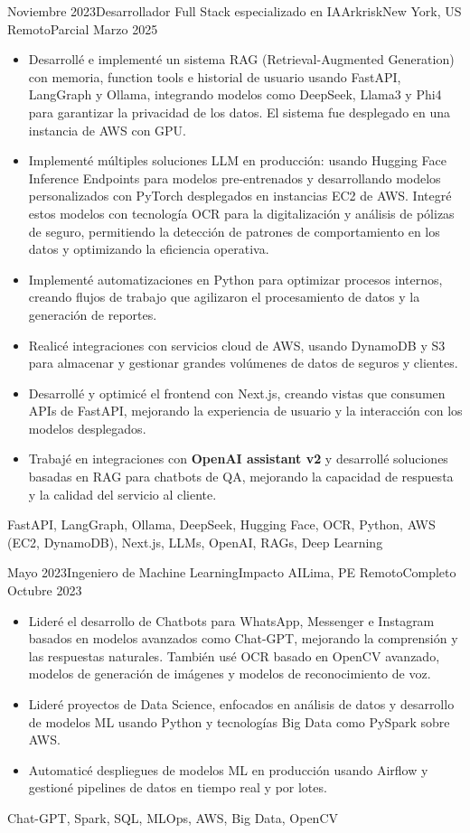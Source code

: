 \begin{experiences}
\emptySeparator
\experience
  {Noviembre 2023}{Desarrollador Full Stack especializado en IA}{Arkrisk}{New York, US}
  {Remoto}{Parcial}
  {Marzo 2025} {
    \begin{itemize}
      \item Desarrollé e implementé un sistema RAG (Retrieval-Augmented Generation) con memoria, function tools e historial de usuario usando FastAPI, LangGraph y Ollama, integrando modelos como DeepSeek, Llama3 y Phi4 para garantizar la privacidad de los datos. El sistema fue desplegado en una instancia de AWS con GPU.
      \item Implementé múltiples soluciones LLM en producción: usando Hugging Face Inference Endpoints para modelos pre-entrenados y desarrollando modelos personalizados con PyTorch desplegados en instancias EC2 de AWS. Integré estos modelos con tecnología OCR para la digitalización y análisis de pólizas de seguro, permitiendo la detección de patrones de comportamiento en los datos y optimizando la eficiencia operativa.
      \item Implementé automatizaciones en Python para optimizar procesos internos, creando flujos de trabajo que agilizaron el procesamiento de datos y la generación de reportes.
      \item Realicé integraciones con servicios cloud de AWS, usando DynamoDB y S3 para almacenar y gestionar grandes volúmenes de datos de seguros y clientes.
      \item Desarrollé y optimicé el frontend con Next.js, creando vistas que consumen APIs de FastAPI, mejorando la experiencia de usuario y la interacción con los modelos desplegados.
      \item Trabajé en integraciones con \textbf{OpenAI assistant v2} y desarrollé soluciones basadas en RAG para chatbots de QA, mejorando la capacidad de respuesta y la calidad del servicio al cliente.
    \end{itemize}
  }
  {FastAPI, LangGraph, Ollama, DeepSeek, Hugging Face, OCR, Python, {AWS (EC2, DynamoDB)}, Next.js, LLMs, OpenAI, RAGs, Deep Learning}

\emptySeparator
\experience
  {Mayo 2023}{Ingeniero de Machine Learning}{Impacto AI}{Lima, PE}
  {Remoto}{Completo}
  {Octubre 2023} {
    \begin{itemize}
      \item Lideré el desarrollo de Chatbots para WhatsApp, Messenger e Instagram basados en modelos avanzados como Chat-GPT, mejorando la comprensión y las respuestas naturales. También usé OCR basado en OpenCV avanzado, modelos de generación de imágenes y modelos de reconocimiento de voz.
      \item Lideré proyectos de Data Science, enfocados en análisis de datos y desarrollo de modelos ML usando Python y tecnologías Big Data como PySpark sobre AWS.
      \item Automaticé despliegues de modelos ML en producción usando Airflow y gestioné pipelines de datos en tiempo real y por lotes.
    \end{itemize}
  }
  {Chat-GPT, Spark, SQL, MLOps, AWS, Big Data, OpenCV}


\end{experiences}

